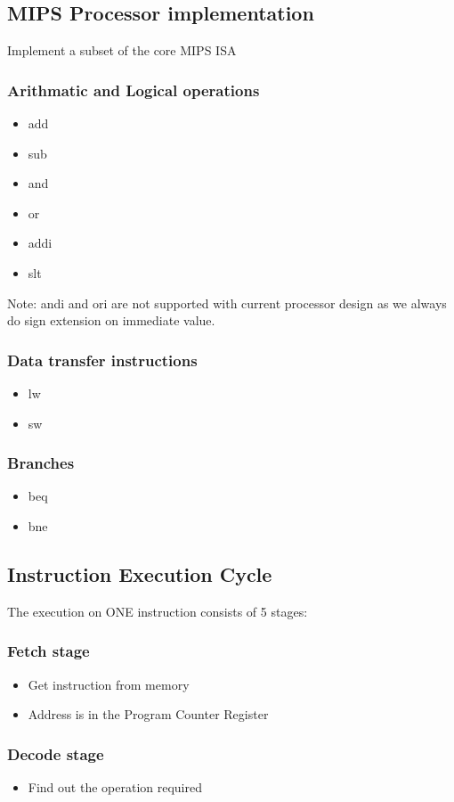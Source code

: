 \documentclass[12pt]{article}
\theoremstyle{definition}
\begin{document}
\subsection{MIPS Processor implementation}
Implement a subset of the core MIPS ISA
\subsubsection{Arithmatic and Logical operations}
\begin{itemize}
    \item add
    \item sub
    \item and 
    \item or 
    \item addi
    \item slt
\end{itemize}
Note: andi and ori are not supported with current processor design as we always do sign extension on immediate value.
\subsubsection{Data transfer instructions}
\begin{itemize}
    \item lw 
    \item sw 
\end{itemize}
\subsubsection{Branches}
\begin{itemize}
    \item beq
    \item bne
\end{itemize}

\subsection{Instruction Execution Cycle}
The execution on ONE instruction consists of 5 stages:
\subsubsection{Fetch stage}
\begin{itemize}
    \item Get instruction from memory
    \item Address is in the Program Counter Register
\end{itemize}
\subsubsection{Decode stage}
\begin{itemize}
    \item Find out the operation required
\end{itemize}
\end{document}
